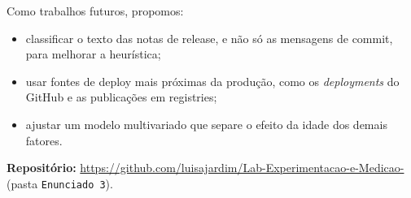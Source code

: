 \documentclass[12pt]{article}
\newcommand{\code}[1]{\texttt{\small #1}}
\begin{document}
Como trabalhos futuros, propomos:
\begin{itemize}
  \item classificar o texto das notas de release, e não só as mensagens de
    commit, para melhorar a heurística;
  \item usar fontes de deploy mais próximas da produção, como os
    \emph{deployments} do GitHub e as publicações em registries;
  \item ajustar um modelo multivariado que separe o efeito da idade dos
    demais fatores.
\end{itemize}

\medskip
\noindent\textbf{Repositório:}
\url{https://github.com/luisajardim/Lab-Experimentacao-e-Medicao-}
(pasta \code{Enunciado 3}).



\end{document}
